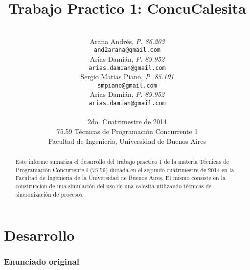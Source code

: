 \documentclass[a4paper,11pt]{article}
\title{\textbf{Trabajo Practico 1: ConcuCalesita}}
\author{\\
  Arana Andrés, \textit{P. 86.203}                                 \\
  \texttt{and2arana@gmail.com}                                     \\ [2.5ex]
  Arias Damián, \textit{P. 89.952}                                 \\
  \texttt{arias.damian@gmail.com}                                  \\ [2.5ex]
  Sergio Matias Piano, \textit{P. 85.191}                          \\
  \texttt{smpiano@gmail.com}                                       \\ [2.5ex]
  Arias Damián, \textit{P. 89.952}       	                   \\
  \texttt{arias.damian@gmail.com}                                  \\ [2.5ex]
                                                                   \\
  \normalsize{2do. Cuatrimestre de 2014}                           \\
  \normalsize{75.59 Técnicas de Programación Concurrente 1}        \\
  \normalsize{Facultad de Ingenieria, Universidad de Buenos Aires} \\
}
\date{}
\begin{document}
\thispagestyle{empty}
\maketitle

\begin{abstract}

  Este informe sumariza el desarrollo del trabajo practico 1 de la materia
  Técnicas de Programación Concurrente I (75.59) dictada en el segundo
  cuatrimestre de 2014 en la Facultad de Ingenieria de la Universidad de Buenos
  Aires. El mismo consiste en la construccion de una simulación del uso de una
  calesita utilizando técnicas de sincronización de procesos.

\end{abstract}

\clearpage

\tableofcontents
\clearpage


\part{Desarrollo}

\section{Enunciado original}\label{sec:enunciado}

\end{document}
